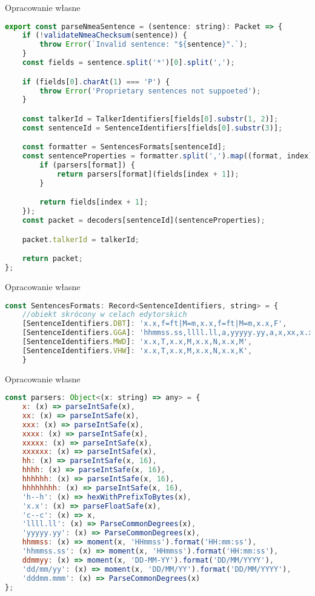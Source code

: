 \documentclass[skorowidz,skroty]{dyplomWEZUT}
\begin{document}
{Opracowanie własne}{\label{code: parseNmeaSentence}}
\begin{lstlisting}[language=JavaScript]
export const parseNmeaSentence = (sentence: string): Packet => {
    if (!validateNmeaChecksum(sentence)) {
        throw Error(`Invalid sentence: "${sentence}".`);
    }
    const fields = sentence.split('*')[0].split(',');

    if (fields[0].charAt(1) === 'P') {
        throw Error('Proprietary sentences not suppoeted');
    }

    const talkerId = TalkerIdentifiers[fields[0].substr(1, 2)];
    const sentenceId = SentenceIdentifiers[fields[0].substr(3)];

    const formatter = SentencesFormats[sentenceId];
    const sentenceProperties = formatter.split(',').map((format, index) => {
        if (parsers[format]) {
            return parsers[format](fields[index + 1]);
        }

        return fields[index + 1];
    });
    const packet = decoders[sentenceId](sentenceProperties);

    packet.talkerId = talkerId;

    return packet;
};
\end{lstlisting}

{Opracowanie własne}{\label{code: SentencesFormats}}
\begin{lstlisting}[language=JavaScript]
const SentencesFormats: Record<SentenceIdentifiers, string> = {
	//obiekt skrócony w celach edytorskich
	[SentenceIdentifiers.DBT]: 'x.x,f=ft|M=m,x.x,f=ft|M=m,x.x,F',
	[SentenceIdentifiers.GGA]: 'hhmmss.ss,llll.ll,a,yyyyy.yy,a,x,xx,x.x,x.x,M,x.x,M,x.x,xxxx',
 	[SentenceIdentifiers.MWD]: 'x.x,T,x.x,M,x.x,N,x.x,M',
    [SentenceIdentifiers.VHW]: 'x.x,T,x.x,M,x.x,N,x.x,K',
    }
\end{lstlisting}

{Opracowanie własne}{\label{code: parsers mapper}}
\begin{lstlisting}[language=JavaScript]
const parsers: Object<(x: string) => any> = {
    x: (x) => parseIntSafe(x),
    xx: (x) => parseIntSafe(x),
    xxx: (x) => parseIntSafe(x),
    xxxx: (x) => parseIntSafe(x),
    xxxxx: (x) => parseIntSafe(x),
    xxxxxx: (x) => parseIntSafe(x),
    hh: (x) => parseIntSafe(x, 16),
    hhhh: (x) => parseIntSafe(x, 16),
    hhhhhh: (x) => parseIntSafe(x, 16),
    hhhhhhhh: (x) => parseIntSafe(x, 16),
    'h--h': (x) => hexWithPrefixToBytes(x),
    'x.x': (x) => parseFloatSafe(x),
    'c--c': (x) => x,
    'llll.ll': (x) => ParseCommonDegrees(x),
    'yyyyy.yy': (x) => ParseCommonDegrees(x),
    hhmmss: (x) => moment(x, 'HHmmss').format('HH:mm:ss'),
    'hhmmss.ss': (x) => moment(x, 'HHmmss').format('HH:mm:ss'),
    ddmmyy: (x) => moment(x, 'DD-MM-YY').format('DD/MM/YYYY'),
    'dd/mm/yy': (x) => moment(x, 'DD/MM/YY').format('DD/MM/YYYY'),
    'dddmm.mmm': (x) => ParseCommonDegrees(x)
};
\end{lstlisting}
\end{document}
